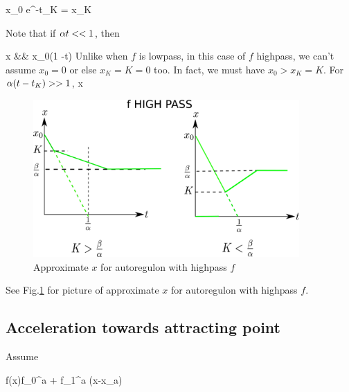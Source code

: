 \beq
x_0 e^{-\alp t_K} = x_K
\eeq

Note that if $\alpha t<<1$, then

\beqa
x &\approx&
x_0(1 -\alp t)
\eeqa
Unlike when $f$ is lowpass, 
in this case of $f$ highpass,
we can't assume $x_0=0$ or else $x_K=K=0$ too. In fact, we must have $x_0 > x_K=K$. For $\alpha (t-t_K) >>1$, 
\beq
x\approx \frac{\beta}{\alp}
\eeq

\begin{figure}[h!]
\centering
\includegraphics[width=4in]
{autoregulons/autoreg-highpass.png}
\caption{Approximate $x$ for autoregulon with highpass $f$}
\label{fig-autoreg-highpass}
\end{figure}
See Fig.\ref{fig-autoreg-highpass}
for picture of 
approximate $x$ for autoregulon with highpass $f$.




\subsection{Acceleration towards attracting point}

Assume 

\beq
f(x)\approx f_0^a + f_1^a (x-x_a)
\eeq


